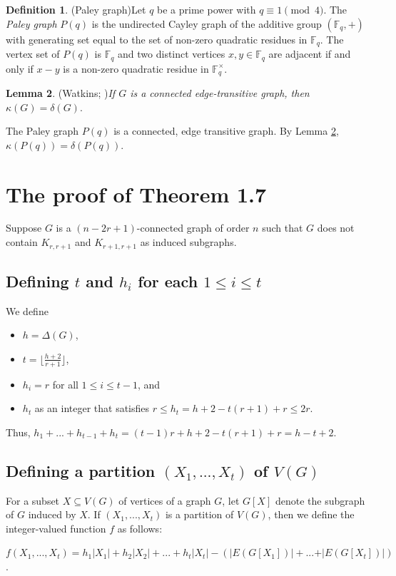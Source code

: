 \documentclass[12pt,reqno,a4paper]{amsart}
\theoremstyle{definition}
\newtheorem{defn}{Definition}[section]
\newtheorem{lem}[defn]{Lemma}
\begin{document}
\begin{defn}{(Paley graph)}\label{Definition 2.6}
Let $q$ be a prime power with $q \equiv 1 \pmod{4}$. The \emph{Paley graph} $P(q)$ is the undirected Cayley graph of the additive group $(\mathbb{F}_{q},+)$ with generating set equal to the set of non-zero quadratic residues in $\mathbb{F}_{q}$. The vertex set of $P(q)$ is $\mathbb{F}_{q}$ and two distinct vertices $x,y \in \mathbb{F}_{q}$ are adjacent if and only if $x-y$ is a non-zero quadratic residue in $\mathbb{F}_{q}^{\times}$.
\end{defn}

\begin{lem}{(Watkins; \cite[Corollary 1A]{Wat1970})}\label{Lemma 2.7}
{\em If $G$ is a connected edge-transitive graph, then $\kappa(G)=\delta(G)$}. 
\end{lem}

The Paley graph $P(q)$ is a connected, edge transitive graph. By Lemma \ref{Lemma 2.7}, $\kappa(P(q))=\delta(P(q))$.

\section{The proof of Theorem 1.7}
Suppose $G$ is a $(n-2r+1)$-connected graph of order $n$ such that
$G$ does not contain $K_{r,r+1}$ and $K_{r+1,r+1}$ as induced subgraphs.

\subsection{Defining $t$ and $h_{i}$ for each $1\leq i\leq t$} We define 
\begin{itemize}
    \item $h=\Delta(G)$,
    \item $t=\lfloor \frac{h+2}{r+1}\rfloor$, 
    \item $h_{i}=r$ for all $1\leq i\leq t-1$, and 
    \item $h_{t}$ as an integer that satisfies $r\leq h_{t}=h+2-t(r+1)+r\leq 2r$.
\end{itemize}
Thus, $h_{1}+...+h_{t-1}+h_{t}=(t-1)r+h+2-t(r+1)+r=h-t+2$.

\subsection{Defining a partition $(X_{1},...,X_{t})$ of $V(G)$} For a subset $X\subseteq V(G)$ of vertices of a graph $G$, let $G[X]$ denote the subgraph of $G$ induced by $X$. If $(X_{1},...,X_{t})$ is a partition of $V(G)$, then we define the integer-valued function $f$ as follows:
\begin{center}
$f(X_{1},...,X_{t})=h_{1}\vert X_{1}\vert + h_{2}\vert X_{2}\vert +... + h_{t}\vert X_{t}\vert-(\vert E(G[X_{1}])\vert +...+ \vert E(G[X_{t}])\vert)$.
\end{center}
\end{document}
